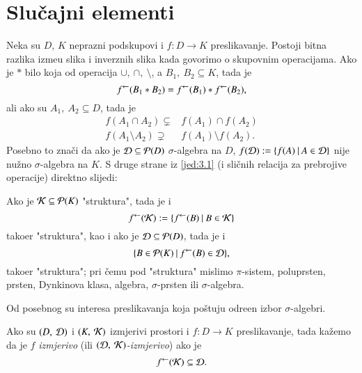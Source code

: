 \usetikzlibrary{arrows,chains,matrix,positioning,scopes}

\chapter{Slu\v cajni elementi} \label{poglavlje3}

Neka su $D$, $K$ neprazni podskupovi i $f: D \to K$ preslikavanje.
Postoji bitna razlika izme\dj u slika i inverznih slika kada govorimo o skupovnim operacijama. Ako je $*$ bilo koja od operacija $\cup, \: \cap, \: \setminus$, a $B_1, \: B_2 \subseteq K$, tada je
\begin{equation} \label{jed:3.1}
    {f}^{\leftarrow} (B_1 * B_2) = {f}^{\leftarrow}(B_1) * {f}^{\leftarrow}(B_2),
\end{equation}
ali ako su $A_1, \: A_2 \subseteq D$, tada je
\begin{align*}
    f(A_1 \cap A_2) \subsetneq& f(A_1) \cap f(A_2) \\
    f(A_1 \setminus A_2) \supsetneq& f(A_1) \setminus f(A_2). 
\end{align*}
Posebno to zna\v ci da ako je $\mathcal{D} \subseteq \mathcal{P}({D})$ $\sigma$-algebra na $D$, $f(\mathcal{D}) := \{{f(A)} \: | \: {A \in \mathcal{D}}\}$ nije nu\v zno $\sigma$-algebra na $K$.
S druge strane iz \eqref{jed:3.1} (i sli\v cnih relacija za prebrojive operacije) direktno slijedi:

Ako je $\mathcal{K} \subseteq \mathcal{P}({K})$ "struktura", tada je i
\begin{equation} \label{jed:3.2}
    {f}^{\leftarrow}(\mathcal{K}) := \{{{f}^{\leftarrow}(B)} \: | \: {B \in
        \mathcal{K}}\}
\end{equation}
tako\dj er "struktura", kao i ako je $\mathcal{D} \subseteq \mathcal{P}({D})$, tada je i
\begin{equation} \label{jed:3.3}
    \{{B \in \mathcal{P}({K})} \: | \: {{f}^{\leftarrow}(B) \in \mathcal{D}}\},
\end{equation}
tako\dj er "struktura"; pri \v cemu pod "struktura" mislimo $\pi$-sistem, poluprsten, prsten, Dynkinova klasa, algebra, $\sigma$-prsten ili $\sigma$-algebra.

Od posebnog su interesa preslikavanja koja po\v stuju odre\dj en
izbor $\sigma$-algebri.
\begin{defn}    \label{defn:3.3-1}
    Ako su $(D, \: \mathcal{D})$ i $(K, \: \mathcal{K})$ izmjerivi prostori i $f: D \to K$ preslikavanje, tada ka\v zemo da je $f$ \emph{izmjerivo} (ili \emph{$(\mathcal{D}, \: \mathcal{K})$-izmjerivo}) ako je
    \begin{equation*}
        {f}^{\leftarrow}(\mathcal{K}) \subseteq \mathcal{D}.
    \end{equation*}
\end{defn}

